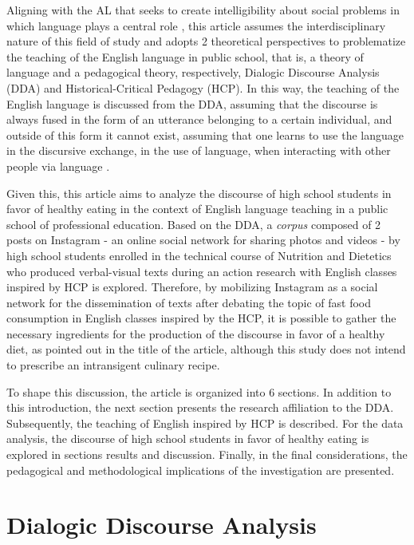 \documentclass[english]{textolivre}
\begin{document}
Aligning with the AL that seeks to create intelligibility about social problems in which language plays a central role \cite{moita2006linguistica}, this article assumes the interdisciplinary nature of this field of study and adopts 2 theoretical perspectives to problematize the teaching of the English language in public school, that is, a theory of language and a pedagogical theory, respectively, Dialogic Discourse Analysis (DDA) and Historical-Critical Pedagogy (HCP). In this way, the teaching of the English language is discussed from the DDA, assuming that the discourse is always fused in the form of an utterance belonging to a certain individual, and outside of this form it cannot exist, assuming that one learns to use the language in the discursive exchange, in the use of language, when interacting with other people via language \cite{bakhtin_os_2016}.

Given this, this article aims to analyze the discourse of high school students in favor of healthy eating in the context of English language teaching in a public school of professional education. Based on the DDA, a \emph{corpus} composed of 2 posts on Instagram - an online social network for sharing photos and videos - by high school students enrolled in the technical course of Nutrition and Dietetics who produced verbal-visual texts during an action research with English classes inspired by HCP is explored. Therefore, by mobilizing Instagram as a social network for the dissemination of texts after debating the topic of fast food consumption in English classes inspired by the HCP, it is possible to gather the necessary ingredients for the production of the discourse in favor of a healthy diet, as pointed out in the title of the article, although this study does not intend to prescribe an intransigent culinary recipe.

To shape this discussion, the article is organized into 6 sections. In addition to this introduction, the next section presents the research affiliation to the DDA. Subsequently, the teaching of English inspired by HCP is described. For the data analysis, the discourse of high school students in favor of healthy eating is explored in sections results and discussion. Finally, in the final considerations, the pedagogical and methodological implications of the investigation are presented.


\section{Dialogic Discourse Analysis}
\end{document}
